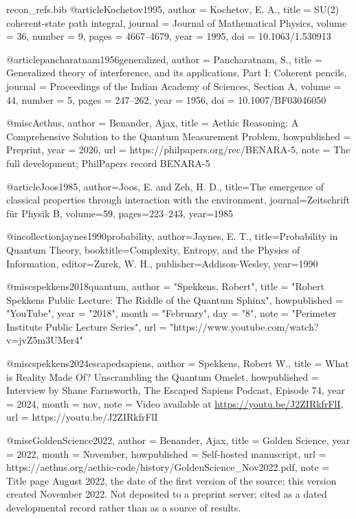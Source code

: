 \begin{filecontents}[overwrite]{recon_refs.bib}
@article{Kochetov1995,
  author  = {Kochetov, E. A.},
  title   = {{SU(2)} coherent-state path integral},
  journal = {Journal of Mathematical Physics},
  volume  = {36},
  number  = {9},
  pages   = {4667--4679},
  year    = {1995},
  doi     = {10.1063/1.530913}
}
 
@article{pancharatnam1956generalized,
  author  = {Pancharatnam, S.},
  title   = {Generalized theory of interference, and its applications. {Part I}: {Coherent} pencils},
  journal = {Proceedings of the Indian Academy of Sciences, Section A},
  volume  = {44},
  number  = {5},
  pages   = {247--262},
  year    = {1956},
  doi     = {10.1007/BF03046050}
}

@misc{Aethus, author = {Benander, Ajax}, title = {Aethic Reasoning: A Comprehensive Solution to the Quantum Measurement Problem}, howpublished = {Preprint}, year = {2026}, url = {https://philpapers.org/rec/BENARA-5}, note = {The full development; PhilPapers record BENARA-5}}

@article{Joos1985, author={Joos, E. and Zeh, H. D.}, title={The emergence of classical properties through interaction with the environment}, journal={Zeitschrift f\"ur Physik B}, volume={59}, pages={223--243}, year={1985}}

@incollection{jaynes1990probability, author={Jaynes, E. T.}, title={Probability in Quantum Theory}, booktitle={Complexity, Entropy, and the Physics of Information}, editor={Zurek, W. H.}, publisher={Addison-Wesley}, year={1990}}

@misc{spekkens2018quantum,
    author = "Spekkens, Robert",
    title = "{Robert Spekkens Public Lecture: The Riddle of the Quantum Sphinx}",
    howpublished = "YouTube",
    year = "2018",
    month = "February",
    day = "8",
    note = "Perimeter Institute Public Lecture Series",
    url = "https://www.youtube.com/watch?v=jvZ5m3UMer4"
}

@misc{spekkens2024escapedsapiens,
  author       = {Spekkens, Robert W.},
  title        = {What is Reality Made Of? {Unscrambling} the Quantum Omelet},
  howpublished = {Interview by Shane Farnsworth, The Escaped Sapiens Podcast, Episode 74},
  year         = {2024},
  month        = nov,
  note         = {Video available at \url{https://youtu.be/J2ZIRkfrFlI}},
  url          = {https://youtu.be/J2ZIRkfrFlI}
}

@misc{GoldenScience2022,
  author       = {Benander, Ajax},
  title        = {Golden Science},
  year         = {2022},
  month        = {November},
  howpublished = {Self-hosted manuscript},
  url          = {https://aethus.org/aethic-code/history/GoldenScience_Nov2022.pdf},
  note         = {Title page August 2022, the date of the first version of the source; this version created November 2022. Not deposited to a
                  preprint server; cited as a dated developmental record rather than
                  as a source of results.}
}


\end{filecontents}
